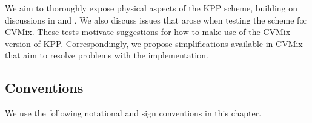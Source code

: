 We aim to thoroughly expose physical aspects of the KPP scheme,
building on discussions in \cite{LargeKPP} and \cite{Large2012}.  We
also discuss issues that arose when testing the scheme for CVMix.
These tests motivate suggestions for how to make use of the CVMix
version of KPP. Correspondingly, we propose simplifications available
in CVMix that aim to resolve problems with the \cite{LargeKPP}
implementation.




\subsection{Conventions}
\label{subsection:conventions}

We use the following notational and sign conventions in this chapter. 

